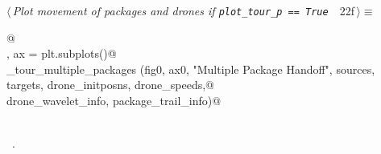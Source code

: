\documentclass[10pt, english, oneside]{report}
\begin{document}
\begin{flushleft} \small
\begin{minipage}{\linewidth}\label{scrap29}\raggedright\small
{} $\langle\,${\itshape Plot movement of packages and drones if \verb|plot_tour_p == True |}\nobreak\ {\footnotesize {22f}}$\,\rangle\equiv$
\vspace{-1ex}
\begin{list}{}{} \item
\mbox{}\verb@   @\\
\mbox{}\verb@fig, ax = plt.subplots()@\\
\mbox{}\verb@plot_tour_multiple_packages (fig0, ax0, "Multiple Package Handoff", sources, targets, drone_initposns, drone_speeds,@\\
\mbox{}\verb@          drone_wavelet_info, package_trail_info)@\\
\mbox{}\verb@@\\
\mbox{}\verb@@{\NWsep}
\end{list}
\vspace{-1.5ex}
\footnotesize
\begin{list}{}{\setlength{\itemsep}{-\parsep}\setlength{\itemindent}{-\leftmargin}}
\item \NWtxtMacroRefIn\ .

\item{}
\end{list}
\end{minipage}\vspace{4ex}
\end{flushleft}
\end{document}

